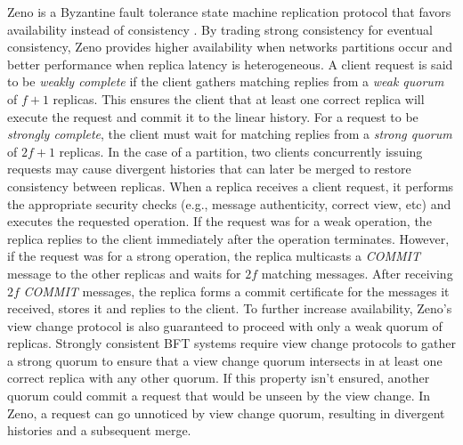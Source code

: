 Zeno is a Byzantine fault tolerance state machine replication protocol that favors availability instead of consistency \cite{Singh2009}. By trading strong consistency for eventual consistency, Zeno provides higher availability when networks partitions occur and better performance when replica latency is heterogeneous.  A client request is said to be \textit{weakly complete} if the client gathers matching replies from a \textit{weak quorum} of $f+1$ replicas. This ensures the client that at least one correct replica will execute the request and commit it to the linear history. For a request to be \textit{strongly complete}, the client must wait for matching replies from a \textit{strong quorum} of $2f+1$ replicas. In the case of a partition, two clients concurrently issuing requests may cause divergent histories that can later be merged to restore consistency between replicas. When a replica receives a client request, it performs the appropriate security checks (e.g., message authenticity, correct view, etc) and executes the requested operation. If the request was for a weak operation, the replica replies to the client immediately after the operation terminates. However, if the request was for a strong operation, the replica multicasts a \textit{COMMIT} message to the other replicas and waits for $2f$ matching messages. After receiving $2f$ \textit{COMMIT} messages, the replica forms a commit certificate for the messages it received, stores it and replies to the client. To further increase availability, Zeno's view change protocol is also guaranteed to proceed with only a weak quorum of replicas. Strongly consistent BFT systems require view change protocols to gather a strong quorum to ensure that a view change quorum intersects in at least one correct replica with any other quorum. If this property isn't ensured, another quorum could commit a request that would be unseen by the view change. In Zeno, a request can go unnoticed by view change quorum, resulting in divergent histories and a subsequent merge. \par
